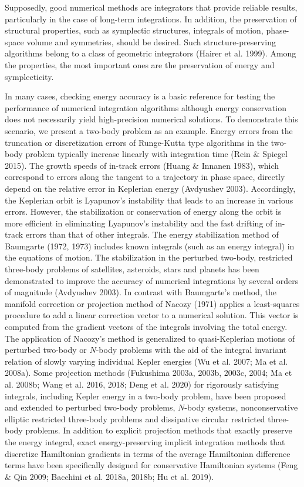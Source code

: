 \documentclass[preprint2]{aastex}
\begin{document}
Supposedly, good numerical methods are integrators that provide
reliable results, particularly in the case of long-term
integrations. In addition, the preservation of structural
properties, such as symplectic structures, integrals of motion,
phase-space volume and symmetries, should be desired. Such
structure-preserving algorithms belong to a class of geometric
integrators (Hairer et al. 1999). Among the properties,  the most
important ones are the preservation of energy and symplecticity.

In many cases, checking energy accuracy is a basic reference for
testing the performance of numerical integration algorithms
although energy conservation does not necessarily yield
high-precision numerical solutions. To demonstrate this scenario,
we present a two-body problem as an example. Energy errors from
the truncation or discretization errors of Runge-Kutta type
algorithms in the two-body problem typically increase linearly
with integration time (Rein $\&$ Spiegel 2015). The growth speeds
of in-track errors (Huang $\&$ Innanen 1983), which correspond to
errors along the tangent to a trajectory in phase space, directly
depend on the relative error in Keplerian energy (Avdyushev 2003).
Accordingly, the Keplerian orbit is Lyapunov's instability that
leads to an increase in various errors. However, the stabilization
or conservation of energy along the orbit is more efficient in
eliminating Lyapunov's instability and the fast drifting of
in-track errors than that of other integrals. The energy
stabilization method of Baumgarte (1972, 1973) includes known
integrals (such as an energy integral) in the equations of motion.
The stabilization in the perturbed two-body, restricted three-body
problems of satellites, asteroids, stars and planets has been
demonstrated to improve the accuracy of numerical integrations by
several orders of magnitude (Avdyushev 2003). In contrast with
Baumgarte's method, the manifold correction or projection method
of Nacozy (1971) applies a least-squares procedure to add a linear
correction vector to a numerical solution. This vector is computed
from the gradient vectors of the integrals involving the total
energy. The application of Nacozy's method is generalized to
quasi-Keplerian motions of perturbed two-body or $N$-body problems
with the aid of the integral invariant relation of slowly varying
individual Kepler energies (Wu et al. 2007; Ma et al. 2008a). Some
projection methods (Fukushima 2003a, 2003b, 2003c, 2004; Ma et al.
2008b; Wang et al. 2016, 2018; Deng et al. 2020) for rigorously
satisfying integrals, including Kepler energy in a two-body
problem, have been proposed and extended to perturbed two-body
problems, $N$-body systems, nonconservative elliptic restricted
three-body problems and dissipative circular restricted three-body
problems. In addition to explicit projection methods that exactly
preserve the energy integral, exact energy-preserving implicit
integration methods that discretize Hamiltonian gradients in terms
of the average Hamiltonian difference terms have been specifically
designed for conservative Hamiltonian systems (Feng $\&$ Qin 2009;
Bacchini et al. 2018a, 2018b; Hu et al. 2019).
\end{document}
